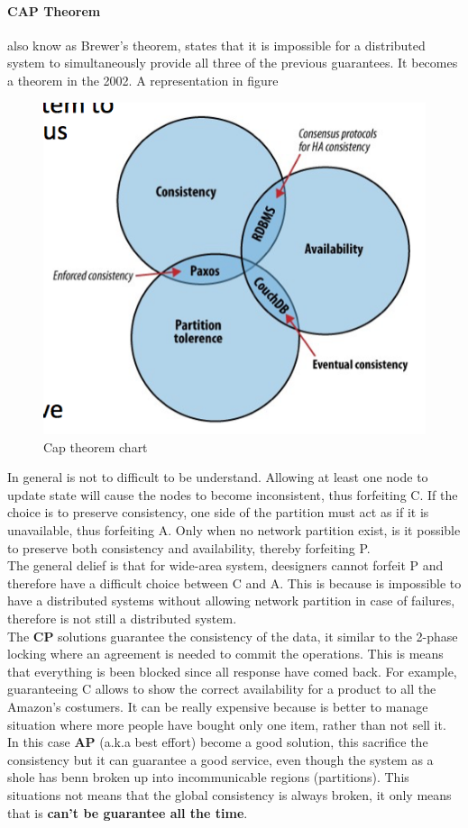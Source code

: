 \documentclass[12pt]{article}
\begin{document}
\paragraph{CAP Theorem} also know as Brewer's theorem, states that it is impossible for a distributed system to simultaneously provide all three of the previous guarantees. It becomes a theorem in the 2002. A representation in figure
\begin{figure}[h!]
  \centering
  \includegraphics[width=0.7\linewidth]{images/cap.png}
  \caption{Cap theorem chart}
  \label{fig:cap}
\end{figure}
In general is not to difficult to be understand. Allowing at least one node to update state will cause the nodes to become inconsistent, thus forfeiting C. If the choice is to preserve consistency, one side of the partition must act as if it is unavailable, thus forfeiting A. Only when no network partition exist, is it possible to preserve both consistency and availability, thereby forfeiting P.\\
The general delief is that for wide-area system, deesigners cannot forfeit P and therefore have a difficult choice between C and A. This is because is impossible to have a distributed systems without allowing network partition in case of failures, therefore is not still a distributed system.\\
The \textbf{CP} solutions guarantee the consistency of the data, it similar to the 2-phase locking where an agreement is needed to commit the operations. This is means that everything is been blocked since all response have comed back. For example, guaranteeing C allows to show the correct availability for a product to all the Amazon's costumers. It can be really expensive because is better to manage situation where more people have bought only one item, rather than not sell it. In this case \textbf{AP} (a.k.a best effort) become a good solution, this sacrifice the consistency but it can guarantee a good service, even though the system as a shole has benn broken up into incommunicable regions (partitions). This situations not means that the global consistency is always broken, it only means that is \textbf{can't be guarantee all the time}.
\end{document}
